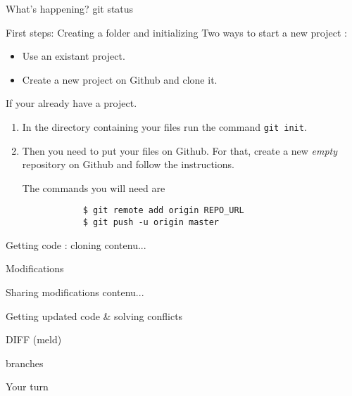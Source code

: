 \documentclass{beamer}
\begin{document}
	\begin{frame}{What's happening?}
		git status
	\end{frame}
	\begin{frame}[fragile]{First steps: Creating a folder and initializing}
		Two ways to start a new project : 
		\begin{itemize}
			\item Use an existant project. 
			\item Create a new project on Github and clone it. \newline
		\end{itemize}
	
		If your already have a project.
		\begin{enumerate}
		\item  In the directory containing your files run the command 
		\texttt{git init}.
		
		\item  Then you need to put your files on Github. For that, create a new \emph{empty} repository on Github and follow the instructions.
		
		The commands you will need are 
		\begin{verbatim}
			$ git remote add origin REPO_URL
			$ git push -u origin master
		\end{verbatim}
		
		\end{enumerate}   
	\end{frame}
	\begin{frame}{Getting code : cloning}
		contenu...
	\end{frame}
	\begin{frame}{Modifications}
		
	\end{frame}
	\begin{frame}{Sharing modifications}
		contenu...
	\end{frame}
	\begin{frame}{Getting updated code \& solving conflicts}
	
	\end{frame}
	\begin{frame}
		DIFF (meld)
	\end{frame}
	\begin{frame}
		branches
	\end{frame}
	\begin{frame}
		Your turn
	\end{frame}	
\end{document}
